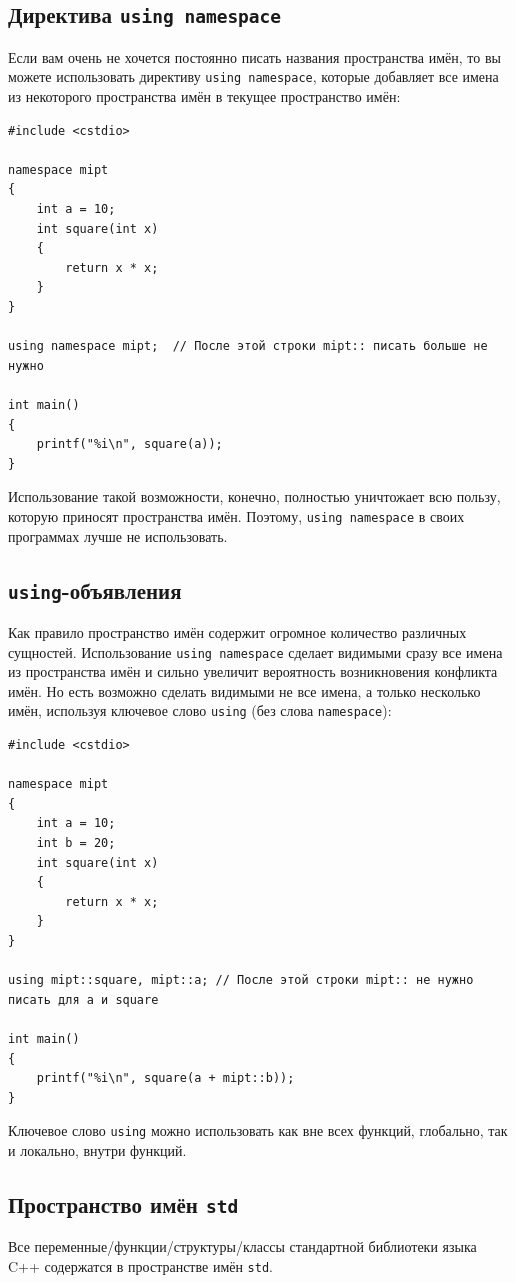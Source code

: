 \documentclass{article}
\begin{document}
\subsection*{Директива \texttt{using namespace}}
Если вам очень не хочется постоянно писать названия пространства имён, то вы можете использовать директиву \texttt{using namespace}, которые добавляет все имена из некоторого пространства имён в текущее пространство имён:
\begin{lstlisting}
#include <cstdio>

namespace mipt 
{
    int a = 10;
    int square(int x)
    {
        return x * x;
    }
}

using namespace mipt;  // После этой строки mipt:: писать больше не нужно

int main() 
{
    printf("%i\n", square(a));
}
\end{lstlisting}
Использование такой возможности, конечно, полностью уничтожает всю пользу, которую приносят пространства имён. Поэтому, \texttt{using namespace} в своих программах лучше не использовать.

\subsection*{\texttt{using}-объявления}
Как правило пространство имён содержит огромное количество различных сущностей. Использование \texttt{using namespace} сделает видимыми сразу все имена из пространства имён и сильно увеличит вероятность возникновения конфликта имён. Но есть возможно сделать видимыми не все имена, а только несколько имён, используя ключевое слово \texttt{using} (без слова \texttt{namespace}): 
\begin{lstlisting}
#include <cstdio>

namespace mipt 
{
    int a = 10;
    int b = 20;
    int square(int x)
    {
        return x * x;
    }
}

using mipt::square, mipt::a; // После этой строки mipt:: не нужно писать для a и square

int main() 
{
    printf("%i\n", square(a + mipt::b));
}
\end{lstlisting}
Ключевое слово \texttt{using} можно использовать как вне всех функций, глобально, так и локально, внутри функций.

\newpage
\subsection*{Пространство имён \texttt{std}}
Все переменные/функции/структуры/классы стандартной библиотеки языка C++ содержатся в пространстве имён \texttt{std}. 
\end{document}
